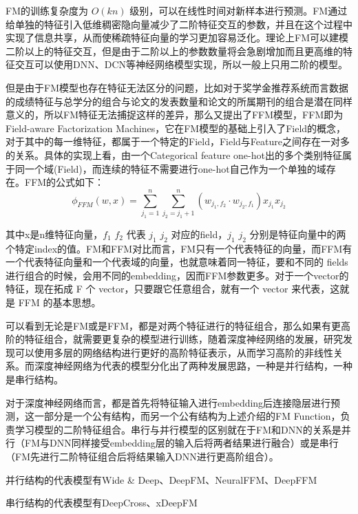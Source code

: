 FM的训练复杂度为 $O(kn)$ 级别，可以在线性时间对新样本进行预测。FM通过给单独的特征引入低维稠密隐向量减少了二阶特征交互的参数，并且在这个过程中实现了信息共享，从而使稀疏特征向量的学习更加容易泛化。理论上FM可以建模二阶以上的特征交互，但是由于二阶以上的参数数量将会急剧增加而且更高维的特征交互可以使用DNN、DCN等神经网络模型实现，所以一般上只用二阶的模型。

但是由于FM模型也存在特征无法区分的问题，比如对于奖学金推荐系统而言数据的成绩特征与总学分的组合与论文的发表数量和论文的所属期刊的组合是潜在同样意义的，所以FM特征无法捕捉这样的差异，那么又提出了FFM模型，FFM即为Field-aware Factorization Machines\cite{juan2016field}，它在FM模型的基础上引入了Field的概念，对于其中的每一维特征，都属于一个特定的Field，Field与Feature之间存在一对多的关系。具体的实现上看，由一个Categorical feature one-hot出的多个类别特征属于同一个域(Field)，而连续的特征不需要进行one-hot自己作为一个单独的域存在。FFM的公式如下：
\begin{equation}
  \phi_{FFM}(w, x) = \sum_{j_1 = 1}^n \sum_{j_2 = j_1 + 1}^n (w_{j_1, f_2} \cdot w_{j_2, f_1})x_{j_1} x_{j_2}
\end{equation}

其中x是n维特征向量，$f_1$ $f_2$ 代表 $j_1$ $j_2$ 对应的field，$j_1$ $j_2$ 分别是特征向量中的两个特定index的值。FM和FFM对比而言，FM只有一个代表特征的向量，而FFM有一个代表特征向量和一个代表域的向量，也就意味着同一特征，要和不同的 fields 进行组合的时候，会用不同的embedding，因而FFM参数更多。对于一个vector的特征，现在拓成 F 个 vector，只要跟它任意组合，就有一个 vector 来代表，这就是 FFM 的基本思想。

可以看到无论是FM或是FFM，都是对两个特征进行的特征组合，那么如果有更高阶的特征组合，就需要更复杂的模型进行训练，随着深度神经网络的发展，研究发现可以使用多层的网络结构进行更好的高阶特征表示，从而学习高阶的非线性关系。而深度神经网络为代表的模型分化出了两种发展思路，一种是并行结构，一种是串行结构。





对于深度神经网络而言，都是首先将特征输入进行embedding后连接隐层进行预测，这一部分是一个公有结构，而另一个公有结构为上述介绍的FM Function，负责学习模型的二阶特征组合。串行与并行模型的区别就在于FM和DNN的关系是并行（FM与DNN同样接受embedding层的输入后将两者结果进行融合）或是串行（FM先进行二阶特征组合后将结果输入DNN进行更高阶组合）。

并行结构的代表模型有Wide \& Deep、DeepFM、NeuralFFM、DeepFFM

串行结构的代表模型有DeepCross、xDeepFM

